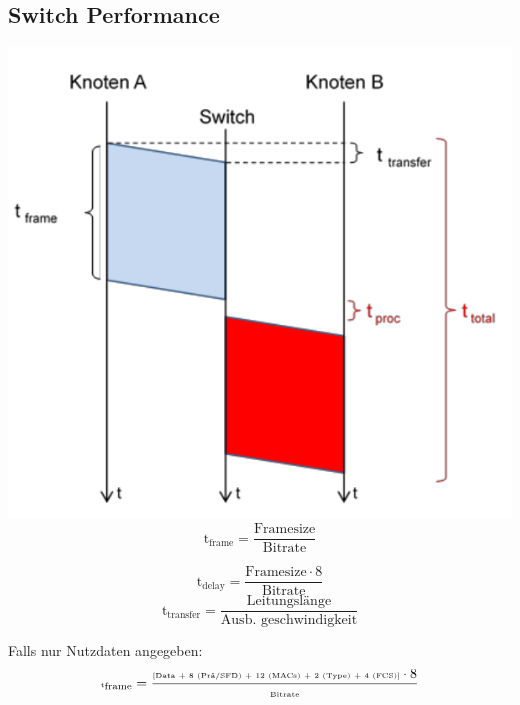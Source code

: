 \subsection{Switch Performance}{

    \includegraphics[scale=.3]{img/sw-perf.png}
    \\
    $$ \text{t}_\text{frame} = \frac{\text{Framesize}}{\text{Bitrate}}  $$

    $$ \text{t}_\text{delay} = \frac{\text{Framesize} \cdot 8}{\text{Bitrate}}  $$
    $$ \text{t}_\text{transfer} = \frac{\text{Leitungslänge}}{\text{Ausb. geschwindigkeit}}  $$

    Falls nur Nutzdaten angegeben:
    $$ \tiny \text{t}_\text{frame} = \frac{\text{[Data + 8 (Prä/SFD) + 12 (MACs) + 2 (Type) + 4 (FCS)]}\cdot 8}{\text{Bitrate}}  $$

}

